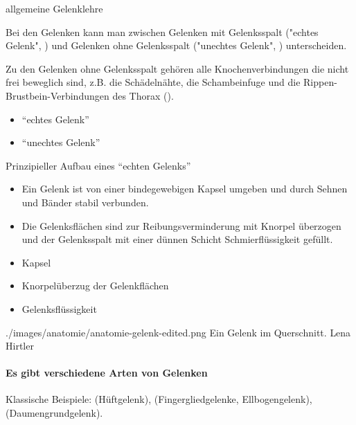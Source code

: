 {allgemeine Gelenklehre}
{
Bei den Gelenken kann man zwischen Gelenken mit Gelenksspalt ("echtes Gelenk",
) und Gelenken ohne Gelenksspalt ("unechtes Gelenk",
) unterscheiden.

Zu den Gelenken ohne Gelenksspalt gehören alle Knochenverbindungen die nicht
frei beweglich sind, z.B. die Schädelnähte, die Schambeinfuge und die
Rippen-Brustbein-Verbindungen des Thorax ().
}
{
\begin{itemize}
  \item "`echtes Gelenk"'
  \item "`unechtes Gelenk"'
\end{itemize}
}{}{}{}

{Prinzipieller Aufbau eines "`echten Gelenks"'}
{\begin{itemize}
\item Ein Gelenk ist von einer bindegewebigen Kapsel umgeben und durch
Sehnen und Bänder stabil verbunden.

\item Die Gelenksflächen sind zur Reibungs\-ver\-minderung mit 
Knorpel überzogen und der Gelenksspalt mit einer dünnen Schicht 
Schmierflüssigkeit  gefüllt. 

\end{itemize}
}{
\begin{itemize}
  \item Kapsel
  \item Knorpelüberzug der Gelenkflächen
  \item Gelenksflüssigkeit
\end{itemize}
}
{./images/anatomie/anatomie-gelenk-edited.png}
{Ein Gelenk im Querschnitt.}
{Lena Hirtler}


\paragraph{Es gibt verschiedene Arten von Gelenken}

Klassische Beispiele:  (Hüftgelenk),
 (Fingergliedgelenke,
Ellbogengelenk),  (Daumengrundgelenk).  


